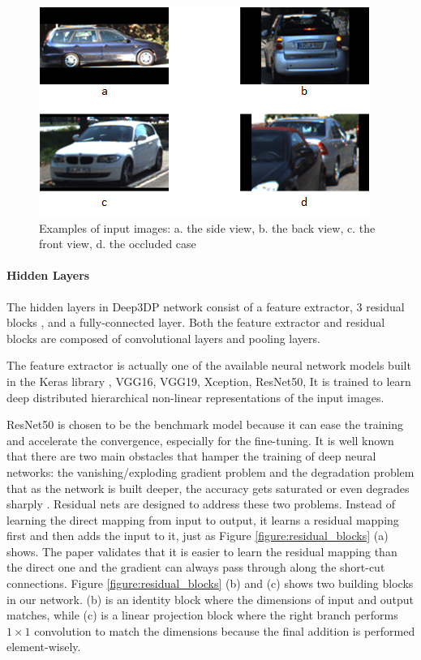 \documentclass[a4paper,12pt]{article}
\begin{document}
\begin{figure}[H]		
	\includegraphics{patches.png}
	\caption[Examples of input images.]{Examples of input images: a. the side view, b. the back view, c. the front view, d. the occluded case}
	\centering
	\label{figure:patches}
\end{figure}

\paragraph{Hidden Layers} 
The hidden layers in Deep3DP network consist of a feature extractor, 3 residual blocks \cite{DBLP:journals/corr/HeZRS15}, and a fully-connected layer. Both the feature extractor and residual blocks are composed of convolutional layers and pooling layers.

The feature extractor is actually one of the available neural network models built in the Keras library \cite{chollet2015keras}, \ie VGG16, VGG19, Xception, ResNet50, \etc  It is trained to  learn deep distributed hierarchical non-linear representations of the input images.

 ResNet50 \cite{DBLP:journals/corr/HeZRS15} is chosen to be the benchmark model because it can ease the training and accelerate the convergence, especially for the fine-tuning. It is well known that there are two main obstacles that hamper the training of deep neural networks: the vanishing/exploding gradient problem \cite{Bengio:1994:LLD:2325857.2328340, pmlr-v9-glorot10a} and the degradation problem that as the network is built deeper, the accuracy gets saturated or even degrades sharply \cite{DBLP:journals/corr/He014}. Residual nets are designed to address these two problems. Instead of learning the direct mapping from input to output, it learns a residual mapping first and then adds the input to it, just as Figure \ref{figure:residual_blocks} (a) shows. The paper validates that it is easier to learn the residual mapping than the direct one and the gradient can always pass through along the short-cut connections. Figure \ref{figure:residual_blocks} (b) and (c) shows two building blocks in our network. (b) is an identity block where the dimensions of input and output matches, while (c) is a linear projection block where the right branch performs $1\times1$ convolution to match the dimensions because the final addition is performed element-wisely.
\end{document}
